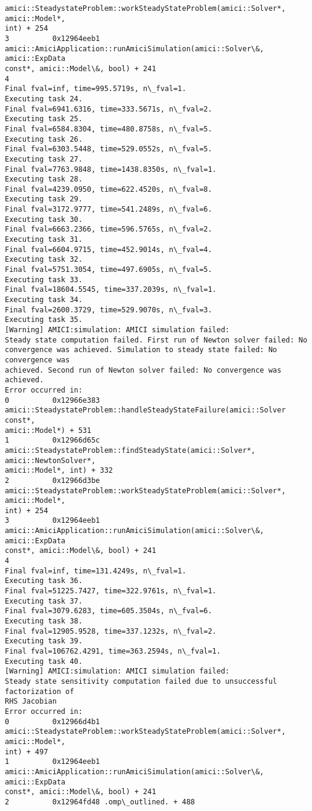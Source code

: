 \documentclass[11pt]{article}
\begin{document}
\begin{Verbatim}[commandchars=\\\{\}]
amici::SteadystateProblem::workSteadyStateProblem(amici::Solver*, amici::Model*,
int) + 254
3          0x12964eeb1
amici::AmiciApplication::runAmiciSimulation(amici::Solver\&, amici::ExpData
const*, amici::Model\&, bool) + 241
4
Final fval=inf, time=995.5719s, n\_fval=1.
Executing task 24.
Final fval=6941.6316, time=333.5671s, n\_fval=2.
Executing task 25.
Final fval=6584.8304, time=480.8758s, n\_fval=5.
Executing task 26.
Final fval=6303.5448, time=529.0552s, n\_fval=5.
Executing task 27.
Final fval=7763.9848, time=1438.8350s, n\_fval=1.
Executing task 28.
Final fval=4239.0950, time=622.4520s, n\_fval=8.
Executing task 29.
Final fval=3172.9777, time=541.2489s, n\_fval=6.
Executing task 30.
Final fval=6663.2366, time=596.5765s, n\_fval=2.
Executing task 31.
Final fval=6604.9715, time=452.9014s, n\_fval=4.
Executing task 32.
Final fval=5751.3054, time=497.6905s, n\_fval=5.
Executing task 33.
Final fval=18604.5545, time=337.2039s, n\_fval=1.
Executing task 34.
Final fval=2600.3729, time=529.9070s, n\_fval=3.
Executing task 35.
[Warning] AMICI:simulation: AMICI simulation failed:
Steady state computation failed. First run of Newton solver failed: No
convergence was achieved. Simulation to steady state failed: No convergence was
achieved. Second run of Newton solver failed: No convergence was achieved.
Error occurred in:
0          0x12966e383
amici::SteadystateProblem::handleSteadyStateFailure(amici::Solver const*,
amici::Model*) + 531
1          0x12966d65c
amici::SteadystateProblem::findSteadyState(amici::Solver*, amici::NewtonSolver*,
amici::Model*, int) + 332
2          0x12966d3be
amici::SteadystateProblem::workSteadyStateProblem(amici::Solver*, amici::Model*,
int) + 254
3          0x12964eeb1
amici::AmiciApplication::runAmiciSimulation(amici::Solver\&, amici::ExpData
const*, amici::Model\&, bool) + 241
4
Final fval=inf, time=131.4249s, n\_fval=1.
Executing task 36.
Final fval=51225.7427, time=322.9761s, n\_fval=1.
Executing task 37.
Final fval=3079.6283, time=605.3504s, n\_fval=6.
Executing task 38.
Final fval=12905.9528, time=337.1232s, n\_fval=2.
Executing task 39.
Final fval=106762.4291, time=363.2594s, n\_fval=1.
Executing task 40.
[Warning] AMICI:simulation: AMICI simulation failed:
Steady state sensitivity computation failed due to unsuccessful factorization of
RHS Jacobian
Error occurred in:
0          0x12966d4b1
amici::SteadystateProblem::workSteadyStateProblem(amici::Solver*, amici::Model*,
int) + 497
1          0x12964eeb1
amici::AmiciApplication::runAmiciSimulation(amici::Solver\&, amici::ExpData
const*, amici::Model\&, bool) + 241
2          0x12964fd48 .omp\_outlined. + 488

\end{Verbatim}
\end{document}
